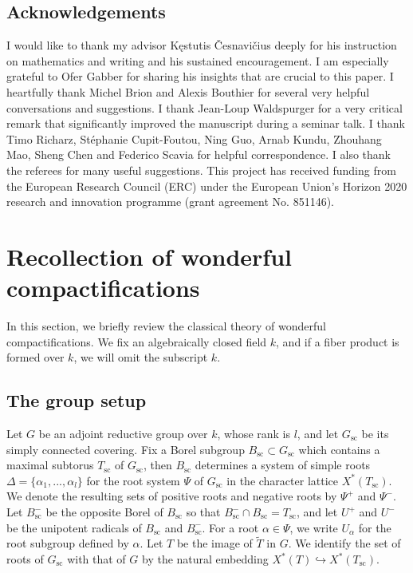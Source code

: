 \documentclass[11pt, reqno]{amsart}
\theoremstyle{plain}
\theoremstyle{definition}
\begin{document}
\subsection{Acknowledgements}
I would like to thank my advisor Kęstutis Česnavičius deeply for his instruction on mathematics and writing and his sustained encouragement. I am especially grateful to Ofer Gabber for sharing his insights that are crucial to this paper. I heartfully thank Michel Brion and Alexis Bouthier for several very helpful conversations and suggestions. I thank Jean-Loup Waldspurger for a very critical remark that significantly improved the manuscript during a seminar talk. I thank Timo Richarz, Stéphanie Cupit-Foutou, Ning Guo, Arnab Kundu, Zhouhang Mao, Sheng Chen and Federico Scavia for helpful correspondence. I also thank the referees for
many useful suggestions. This project has received funding from the European Research Council (ERC) under the European Union’s Horizon 2020 research and innovation programme (grant agreement No. 851146).








\section{Recollection of wonderful compactifications}\label{wonderfulcomp}
In this section, we briefly review the classical theory of wonderful compactifications. We fix an algebraically closed field $k$, and if a fiber product is formed over $k$, we will omit the subscript $k$. 

\subsection{The group setup}
Let $G$ be an adjoint reductive group over $k$, whose rank is $l$, and let $G_{\text{sc}}$ be its simply connected covering. Fix a Borel subgroup $B_{\text{sc}}\subset G_{\text{sc}}$ which contains a maximal subtorus $T_{\text{sc}}$ of $G_{\text{sc}}$, then $B_{\text{sc}}$ determines a system of simple roots $\Delta=\{\alpha_1,...,\alpha_l\}$ for the root system $\Psi$ of $G_{\text{sc}}$ in the character lattice $X^*(T_{\text{sc}})$. We denote the resulting sets of positive roots and negative roots by $\Psi^+$ and $\Psi^-$. Let $B_{\text{sc}}^-$ be the opposite Borel of $B_{\text{sc}}$ so that $B_{\text{sc}}^-\cap B_{\text{sc}}=T_{\text{sc}}$, and let $U^+$ and $U^-$ be the unipotent radicals of $B_{\text{sc}}$ and $B_{\text{sc}}^-$. For a root $\alpha\in \Psi$, we write $U_{\alpha}$ for the root subgroup defined by $\alpha$. Let $T$ be the image of $\widetilde{T}$ in $G$. We identify the set of roots of $G_{\text{sc}}$ with that of $G$ by the natural embedding $X^*(T)\hookrightarrow X^*(T_{\text{sc}})$.
\end{document}

